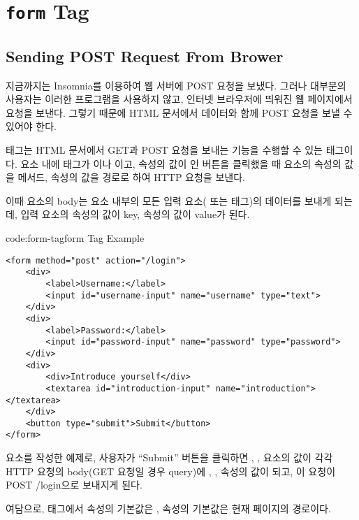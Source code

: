 \section{\texttt{form} Tag}\label{sect:form-tag}

\subsection*{Sending POST Request From Brower}

지금까지는 Insomnia를 이용하여 웹 서버에 POST 요청을 보냈다. 그러나 대부분의 사용자는 이러한 프로그램을 사용하지 않고, 인터넷 브라우저에 띄워진 웹 페이지에서 요청을 보낸다. 그렇기 때문에 HTML 문서에서  데이터와 함께 POST 요청을 보낼 수 있어야 한다.

 태그는 HTML 문서에서 GET과 POST 요청을 보내는 기능을 수행할 수 있는 태그이다.  요소 내에 태그가 이나 이고,  속성의 값이 인 버튼을 클릭했을 때  요소의  속성의 값을 메서드,  속성의 값을 경로로 하여 HTTP 요청을 보낸다. 

이때  요소의 body는 요소 내부의 모든 입력 요소( 또는  태그)의 데이터를 보내게 되는데, 입력 요소의  속성의 값이 key,  속성의 값이 value가 된다.

\begin{codeenv}{code:form-tag}{form Tag Example}\begin{verbatim}
<form method="post" action="/login">
    <div>
        <label>Username:</label>
        <input id="username-input" name="username" type="text">
    </div>
    <div>
        <label>Password:</label>
        <input id="password-input" name="password" type="password">
    </div>
    <div>
        <div>Introduce yourself</div>
        <textarea id="introduction-input" name="introduction"></textarea>
    </div>
    <button type="submit">Submit</button>
</form>
\end{verbatim}
\end{codeenv}

\는  요소를 작성한 예제로, 사용자가 ``Submit'' 버튼을 클릭하면 , ,  요소의  값이 각각 HTTP 요청의 body(GET 요청일 경우 query)에 , ,  속성의 값이 되고, 이 요청이 POST /login으로 보내지게 된다.

여담으로,  태그에서  속성의 기본값은 ,  속성의 기본값은 현재 페이지의 경로이다.
